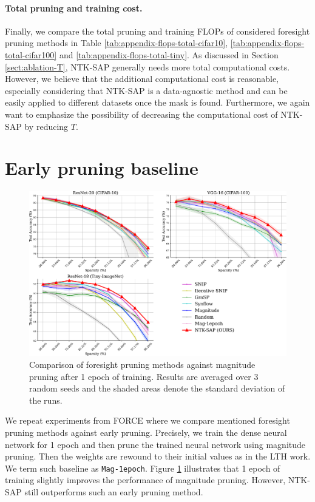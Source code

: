 \documentclass{article} %
\begin{document}
\paragraph{Total pruning and training cost.} Finally, we compare the total pruning and training FLOPs of considered foresight pruning methods in Table \ref{tab:appendix-flops-total-cifar10}, \ref{tab:appendix-flops-total-cifar100} and \ref{tab:appendix-flops-total-tiny}. As discussed in Section \ref{sect:ablation-T}, NTK-SAP generally needs more total computational costs. However, we believe that the additional computational cost is reasonable, especially considering that NTK-SAP is a data-agnostic method and can be easily applied to different datasets once the mask is found. Furthermore, we again want to emphasize the possibility of decreasing the computational cost of NTK-SAP by reducing $T$. 

\section{Early pruning baseline}  \label{sect:appendix-mag1epoch}
\begin{figure}[h]
  \centering
    \includegraphics[width=\textwidth]{plots/test_single_magbase.pdf}
   \caption{Comparison of foresight pruning methods against magnitude pruning after 1 epoch of training. Results are averaged over 3 random seeds and the shaded areas denote the standard deviation of the runs.}
   \label{fig:appendix-mag1epoch}
\end{figure}
We repeat experiments from FORCE \citep{force} where we compare mentioned foresight pruning methods against early pruning. Precisely, we train the dense neural network for 1 epoch and then prune the trained neural network using magnitude pruning. Then the weights are rewound to their initial values as in the LTH work. We term such baseline as \texttt{Mag-1epoch}. Figure \ref{fig:appendix-mag1epoch} illustrates that 1 epoch of training slightly improves the performance of magnitude pruning. However, NTK-SAP still outperforms such an early pruning method.
\end{document}
